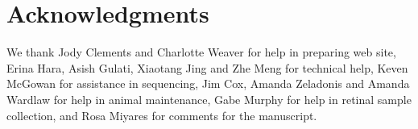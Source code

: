 \section{Acknowledgments}
We thank Jody Clements and Charlotte Weaver for help in preparing web site, Erina Hara, Asish Gulati, Xiaotang Jing and Zhe Meng for technical help, Keven McGowan for assistance in sequencing, Jim Cox, Amanda Zeladonis and Amanda Wardlaw for help in animal maintenance, Gabe Murphy for help in retinal sample collection, and Rosa Miyares for comments for the manuscript.
